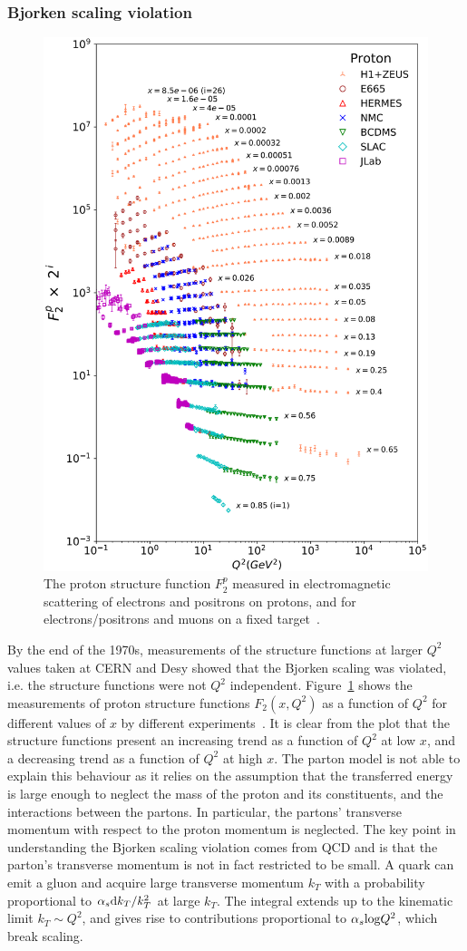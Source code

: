 \subsubsection{Bjorken scaling violation}
\begin{figure}[htb]
    \centering
    \includegraphics[width=0.6\linewidth]{Figures/Chapter 2/F2Results.png}
    \caption{The proton structure function $F^p_2$ measured in electromagnetic scattering of electrons and positrons on protons, and for electrons/positrons and muons on a fixed target~\cite{pdg}.}
    \label{fig:scaling_violation}
\end{figure}
By the end of the 1970s, measurements of the structure functions at larger $Q^2$ values taken at CERN and Desy showed that the Bjorken scaling was violated, i.e. the structure functions were not $Q^2$ independent. Figure~\ref{fig:scaling_violation} shows the measurements of proton structure functions $F_2(x,Q^2)$ as a function of $Q^2$ for different values of $x$ by different experiments~\cite{pdg}. It is clear from the plot that the structure functions present an increasing trend as a function of $Q^2$ at low $x$, and a decreasing trend as a function of $Q^2$ at high $x$. The parton model is not able to explain this behaviour as it relies on the assumption that the transferred energy is large enough to neglect the mass of the proton and its constituents, and the interactions between the partons. In particular, the partons' transverse momentum with respect to the proton momentum is neglected. The key point in understanding the Bjorken scaling violation comes from QCD and is that the parton's transverse momentum is not in fact restricted to be small. A quark can emit a gluon and acquire large transverse momentum $k_T$ with a probability proportional to $\alpha_s \mathrm{d} k_T/k_T^2$ at large $k_T$. The integral extends up to the kinematic limit $k_T\sim Q^2$, and gives rise to contributions proportional to $\alpha_s\mathrm{log}Q^2$, which break scaling.


